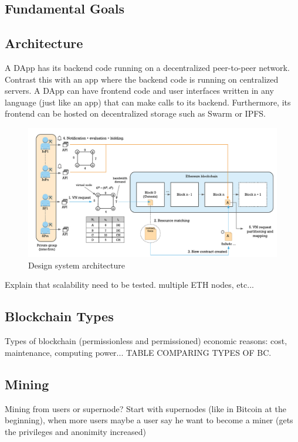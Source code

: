 \subsection{Fundamental Goals}

\subsection{Architecture}

A DApp has its backend code running on a decentralized peer-to-peer network. Contrast this with an app where the backend code is running on centralized servers. A DApp can have frontend code and user interfaces written in any language (just like an app) that can make calls to its backend. Furthermore, its frontend can be hosted on decentralized storage such as Swarm or IPFS.

\begin{figure}[bth]
	\centering
	\includegraphics[width=1\linewidth]{gfx/designWorkflow}    
  	\caption{Design system architecture}
  	\label{fig:designWorkflow}
\end{figure}

Explain that scalability need to be tested. multiple ETH nodes, etc...

\subsection{Blockchain Types}

Types of blockchain (permissionless and permissioned) economic reasons: cost, maintenance, computing power...  TABLE COMPARING TYPES OF BC.

\subsection{Mining}

Mining from users or supernode? Start with supernodes (like in Bitcoin at the beginning), when more users maybe a user say he want to become a miner (gets the privileges and anonimity increased)

